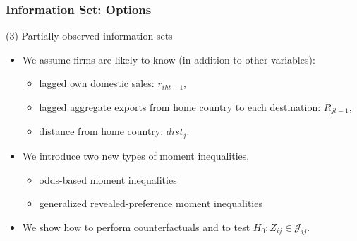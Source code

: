 \begin{frame}[label=mom_ineq_slide]
\frametitle{Information Set: Options}

(3) Partially observed information sets
\begin{itemize}
	\item We assume firms are likely to know (in addition to other variables):
	\begin{itemize}
		\item lagged own domestic sales: $r_{iht-1}$,
		\item lagged aggregate exports from home country to each destination: $R_{jt-1}$,
		\item distance from home country: $dist_{j}$.
	\end{itemize}
	\item We introduce two new types of moment inequalities,
	\begin{itemize}
		\item odds-based moment inequalities
		\item generalized revealed-preference moment inequalities
	\end{itemize}
	\item We show how to perform counterfactuals and to test $H_{0}: Z_{ij}\in\mathcal{J}_{ij}$.
\end{itemize}
\end{frame}

